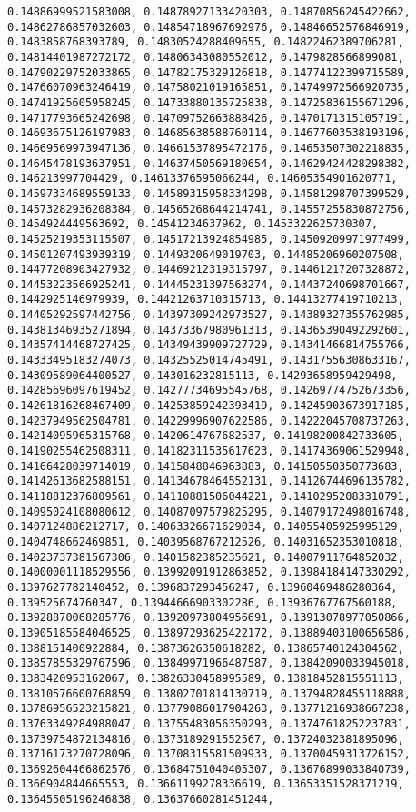 \documentclass[11pt]{article}
\begin{document}
\begin{Verbatim}[commandchars=\\\{\}]
0.14886999521583008, 0.14878927133420303, 0.14870856245422662, 0.14862786857032603, 0.14854718967692976, 0.14846652576846919, 0.1483858768393789, 0.14830524288409655, 0.14822462389706281, 0.14814401987272172, 0.14806343080552012, 0.1479828566899081, 0.14790229752033865, 0.14782175329126818, 0.14774122399715589, 0.14766070963246419, 0.14758021019165851, 0.14749972566920735, 0.14741925605958245, 0.14733880135725838, 0.14725836155671296, 0.14717793665242698, 0.14709752663888426, 0.14701713151057191, 0.14693675126197983, 0.14685638588760114, 0.14677603538193196, 0.14669569973947136, 0.14661537895472176, 0.14653507302218835, 0.14645478193637951, 0.14637450569180654, 0.14629424428298382, 0.146213997704429, 0.14613376595066244, 0.14605354901620771, 0.14597334689559133, 0.14589315958334298, 0.14581298707399529, 0.14573282936208384, 0.14565268644214741, 0.14557255830872756, 0.1454924449563692, 0.14541234637962, 0.1453322625730307, 0.14525219353115507, 0.14517213924854985, 0.14509209971977499, 0.14501207493939319, 0.1449320649019703, 0.14485206960207508, 0.14477208903427932, 0.14469212319315797, 0.14461217207328872, 0.14453223566925241, 0.14445231397563274, 0.14437240698701667, 0.1442925146979939, 0.14421263710315713, 0.14413277419710213, 0.14405292597442756, 0.14397309242973527, 0.14389327355762985, 0.14381346935271894, 0.14373367980961313, 0.14365390492292601, 0.14357414468727425, 0.14349439909727729, 0.14341466814755766, 0.14333495183274073, 0.14325525014745491, 0.14317556308633167, 0.14309589064400527, 0.143016232815113, 0.14293658959429498, 0.14285696097619452, 0.14277734695545768, 0.14269774752673356, 0.14261816268467409, 0.14253859242393419, 0.14245903673917185, 0.14237949562504781, 0.14229996907622586, 0.14222045708737263, 0.14214095965315768, 0.1420614767682537, 0.14198200842733605, 0.14190255462508311, 0.14182311535617623, 0.14174369061529948, 0.14166428039714019, 0.1415848846963883, 0.14150550350773683, 0.14142613682588151, 0.14134678464552131, 0.14126744696135782, 0.14118812376809561, 0.14110881506044221, 0.14102952083310791, 0.14095024108080612, 0.14087097579825295, 0.14079172498016748, 0.1407124886212717, 0.14063326671629034, 0.14055405925995129, 0.1404748662469851, 0.14039568767212526, 0.14031652353010818, 0.14023737381567306, 0.1401582385235621, 0.14007911764852032, 0.14000001118529556, 0.13992091912863852, 0.13984184147330292, 0.1397627782140452, 0.1396837293456247, 0.13960469486280364, 0.139525674760347, 0.13944666903302286, 0.13936767767560188, 0.13928870068285776, 0.13920973804956691, 0.13913078977050866, 0.13905185584046525, 0.13897293625422172, 0.13889403100656586, 0.1388151400922884, 0.13873626350618282, 0.13865740124304562, 0.13857855329767596, 0.13849971966487587, 0.13842090033945018, 0.1383420953162067, 0.13826330458995589, 0.13818452815551113, 0.13810576600768859, 0.13802701814130719, 0.13794828455118888, 0.13786956523215821, 0.13779086017904263, 0.13771216938667238, 0.13763349284988047, 0.13755483056350293, 0.13747618252237831, 0.13739754872134816, 0.1373189291552567, 0.13724032381895096, 0.13716173270728096, 0.13708315581509933, 0.13700459313726152, 0.13692604466862576, 0.13684751040405307, 0.13676899033840739, 0.1366904844665553, 0.13661199278336619, 0.13653351528371219, 0.13645505196246838, 0.13637660281451244, 
\end{Verbatim}
\end{document}
